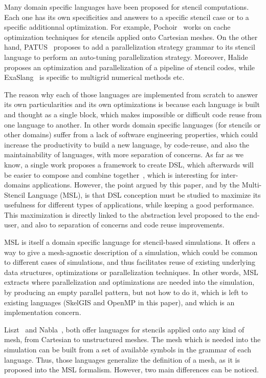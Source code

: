 Many domain specific languages have been proposed for stencil computations. Each one has its own specificities and answers to a specific stencil case or to a specific additionnal optimization. For example, Pochoir~\cite{spaaTangCKLL11} works on cache optimization techniques for stencils applied onto Cartesian meshes. On the other hand, PATUS~\cite{citeulike12258902} proposes to add a parallelization strategy grammar to its stencil language to perform an auto-tuning parallelization strategy. Moreover, Halide~\cite{Ragan-Kelley:2013:HLC:2491956.2462176}  proposes an optimization and parallelization of a pipeline of stencil codes, while ExaSlang~\cite{Schmitt:2014:EDL:2691166.2691171} is specific to multigrid numerical methods etc.

The reason why each of those languages are implemented from scratch to answer its own particularities and its own optimizations is because each language is built and thought as a single block, which makes impossible or difficult code reuse from one language to another. In other words domain specific languages (for stencils or other domains) suffer from a lack of software engineering properties, which could increase the productivity to build a new language, by code-reuse, and also the maintainability of languages, with more separation of concerns. As far as we know, a single work proposes a framework to create DSL, which afterwards will be easier to compose and combine together~\cite{Sujeeth:2013:CRC:2524984.2524988}, which is interesting for inter-domains applications. However, the point argued by this paper, and by the Multi-Stencil Language (MSL), is that DSL conception must be studied to maximize its usefulness for different types of applications, while keeping a good performance. This maximization is directly linked to the abstraction level proposed to the end-user, and also to separation of concerns and code reuse improvements.

MSL is itself a domain specific language for stencil-based simulations. It offers a way to give a mesh-agnostic description of a simulation, which could be common to different cases of simulations, and thus facilitates reuse of existing underlying data structures, optimizations or parallelization techniques. In other words, MSL extracts where parallelization and optimizations are needed into the simulation, by producing an empty parallel pattern, but not how to do it, which is left to existing languages (SkelGIS and OpenMP in this paper), and which is an implementation concern.

Liszt~\cite{DeVito:2011:LDS:2063384.2063396} and Nabla~\cite{Camier:2015:IPP:2820083.2820107}, both offer languages for stencils applied onto any kind of mesh, from Cartesian to unstructured meshes. The mesh which is needed into the simulation can be built from a set of available symbols in the grammar of each language. Thus, those languages generalize the definition of a mesh, as it is proposed into the MSL formalism. 
However, two main differences can be noticed. 

